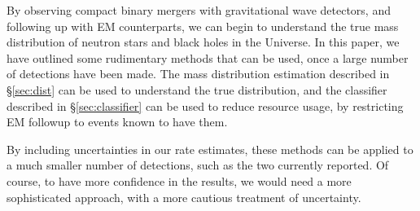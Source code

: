 By observing compact binary mergers with gravitational wave detectors, and following up with EM counterparts, we can begin to understand the true mass distribution of neutron stars and black holes in the Universe. In this paper, we have outlined some rudimentary methods that can be used, once a large number of detections have been made. The mass distribution estimation described in \S\ref{sec:dist} can be used to understand the true distribution, and the classifier described in \S\ref{sec:classifier} can be used to reduce resource usage, by restricting EM followup to events known to have them.

By including uncertainties in our rate estimates, these methods can be applied to a much smaller number of detections, such as the two currently reported. Of course, to have more confidence in the results, we would need a more sophisticated approach, with a more cautious treatment of uncertainty.